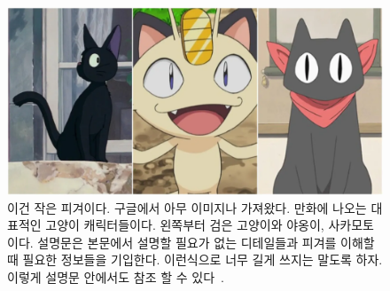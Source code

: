 \begin{figure}[H]
\includegraphics[width=\linewidth]{images/cats.jpg}
\caption{이건 작은 피겨이다. 구글에서 아무 이미지나 가져왔다. 만화에 나오는 대표적인 고양이 캐릭터들이다. 왼쪽부터 검은 고양이와 야옹이, 사카모토이다. 설명문은 본문에서 설명할 필요가 없는 디테일들과 피겨를 이해할 때 필요한 정보들을 기입한다. 이런식으로 너무 길게 쓰지는 말도록 하자. 이렇게 설명문 안에서도 참조 할 수 있다~\cite{texbook}.}
\label{fig:small}
\centering
\end{figure}